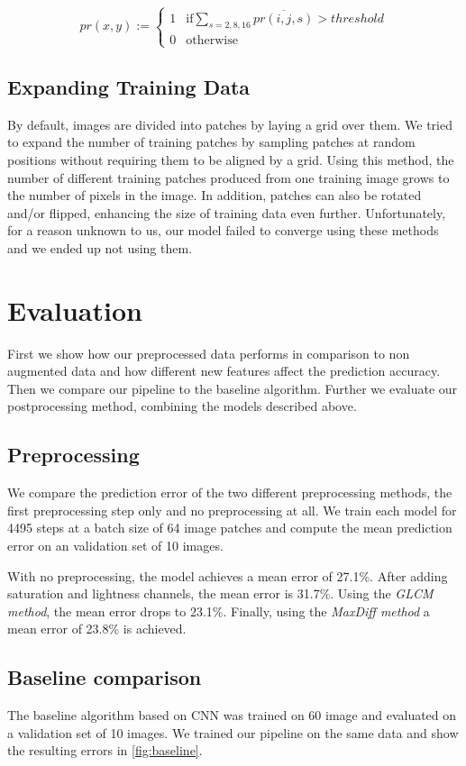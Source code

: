\documentclass[10pt,conference,compsocconf]{IEEEtran}
\begin{document}
\[
pr(x,y) :=
\begin{cases}
	1 & \text{if} \sum_{s={2,8,16}} \overline{pr(i,j,s)} > threshold\\
	0 & \text{otherwise}
\end{cases}
\]

\subsection{Expanding Training Data}

By default, images are divided into patches by laying a grid over them.
We tried to expand the number of training patches by sampling patches at random positions without requiring them to be aligned by a grid.
Using this method, the number of different training patches produced from one training image grows to the number of pixels in the image.
In addition, patches can also be rotated and/or flipped, enhancing the size of training data even further.
Unfortunately, for a reason unknown to us, our model failed to converge using these methods and we ended up not using them.

\section{Evaluation}
First we show how our preprocessed data performs in comparison to non augmented data and how different new features affect the prediction accuracy. Then we compare our pipeline to the baseline algorithm. Further we evaluate our postprocessing method, combining the models described above. 

\subsection{Preprocessing}

We compare the prediction error of the two different preprocessing methods, the first preprocessing step only and no preprocessing at all.
We train each model for 4495 steps at a batch size of 64 image patches and compute the mean prediction error on an validation set of 10 images.

With no preprocessing, the model achieves a mean error of 27.1\%.
After adding saturation and lightness channels, the mean error is 31.7\%.
Using the \emph{GLCM method}, the mean error drops to 23.1\%.
Finally, using the \emph{MaxDiff method} a mean error of 23.8\% is achieved.

\subsection{Baseline comparison}
The baseline algorithm based on CNN was trained on 60 image and evaluated on a validation set of 10 images. We trained our pipeline on the same data and show the resulting errors in \ref{fig:baseline}. 
\end{document}
